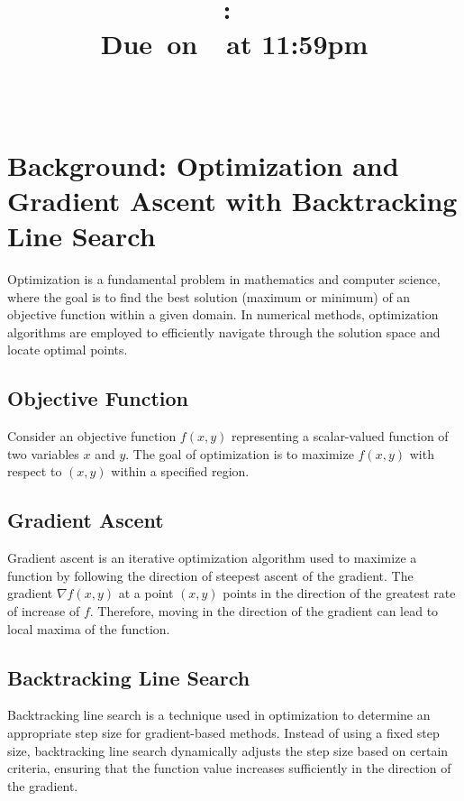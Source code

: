 \documentclass{article}
\title{
    \vspace{2in}
    \textmd{\textbf{\hmwkClass:\ \hmwkTitle}}\\
    \normalsize\vspace{0.1in}\small{Due\ on\ \hmwkDueDate\ at 11:59pm}\\
    \vspace{0.1in}\large{\textit{\hmwkClassInstructor\ \hmwkClassTime}}
    \vspace{3in}
}
\author{\hmwkAuthorName}
\date{}
\begin{document}
\maketitle

\pagebreak

\tableofcontents

\pagebreak

\section{Background: Optimization and Gradient Ascent with Backtracking Line Search}

Optimization is a fundamental problem in mathematics and computer science, where the goal is to find the best solution (maximum or minimum) of an objective function within a given domain. In numerical methods, optimization algorithms are employed to efficiently navigate through the solution space and locate optimal points.

\subsection{Objective Function}
Consider an objective function \( f(x, y) \) representing a scalar-valued function of two variables \( x \) and \( y \). The goal of optimization is to maximize \( f(x, y) \) with respect to \( (x, y) \) within a specified region.

\subsection{Gradient Ascent}
Gradient ascent is an iterative optimization algorithm used to maximize a function by following the direction of steepest ascent of the gradient. The gradient \( \nabla f(x, y) \) at a point \( (x, y) \) points in the direction of the greatest rate of increase of \( f \). Therefore, moving in the direction of the gradient can lead to local maxima of the function.

\subsection{Backtracking Line Search}
Backtracking line search is a technique used in optimization to determine an appropriate step size for gradient-based methods. Instead of using a fixed step size, backtracking line search dynamically adjusts the step size based on certain criteria, ensuring that the function value increases sufficiently in the direction of the gradient.
\end{document}
